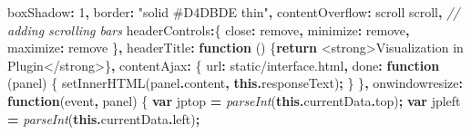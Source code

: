 \documentclass[
]{article}
\newenvironment{Shaded}{\begin{snugshade}}{\end{snugshade}}
\newcommand{\AttributeTok}[1]{\textcolor[rgb]{0.77,0.63,0.00}{#1}}
\newcommand{\BuiltInTok}[1]{#1}
\newcommand{\CommentTok}[1]{\textcolor[rgb]{0.56,0.35,0.01}{\textit{#1}}}
\newcommand{\ControlFlowTok}[1]{\textcolor[rgb]{0.13,0.29,0.53}{\textbf{#1}}}
\newcommand{\DataTypeTok}[1]{\textcolor[rgb]{0.13,0.29,0.53}{#1}}
\newcommand{\DecValTok}[1]{\textcolor[rgb]{0.00,0.00,0.81}{#1}}
\newcommand{\FunctionTok}[1]{\textcolor[rgb]{0.00,0.00,0.00}{#1}}
\newcommand{\KeywordTok}[1]{\textcolor[rgb]{0.13,0.29,0.53}{\textbf{#1}}}
\newcommand{\NormalTok}[1]{#1}
\newcommand{\OperatorTok}[1]{\textcolor[rgb]{0.81,0.36,0.00}{\textbf{#1}}}
\newcommand{\PreprocessorTok}[1]{\textcolor[rgb]{0.56,0.35,0.01}{\textit{#1}}}
\newcommand{\StringTok}[1]{\textcolor[rgb]{0.31,0.60,0.02}{#1}}
\begin{document}
\begin{Shaded}
\begin{Highlighting}[]
    \DataTypeTok{boxShadow}\OperatorTok{:} \DecValTok{1}\OperatorTok{,}
    \DataTypeTok{border}\OperatorTok{:} \StringTok{"solid \#D4DBDE thin"}\OperatorTok{,}
    \DataTypeTok{contentOverflow}\OperatorTok{:} \StringTok{\textquotesingle{}scroll scroll\textquotesingle{}}\OperatorTok{,} \CommentTok{// adding scrolling bars}
    \DataTypeTok{headerControls}\OperatorTok{:}\NormalTok{\{}
      \DataTypeTok{close}\OperatorTok{:} \StringTok{\textquotesingle{}remove\textquotesingle{}}\OperatorTok{,}
      \DataTypeTok{minimize}\OperatorTok{:} \StringTok{\textquotesingle{}remove\textquotesingle{}}\OperatorTok{,}
      \DataTypeTok{maximize}\OperatorTok{:} \StringTok{\textquotesingle{}remove\textquotesingle{}}
\NormalTok{    \}}\OperatorTok{,}
    \DataTypeTok{headerTitle}\OperatorTok{:} \KeywordTok{function}\NormalTok{ () \{}\ControlFlowTok{return} \StringTok{\textquotesingle{}\textless{}strong\textgreater{}Visualization in Plugin\textless{}/strong\textgreater{}\textquotesingle{}}\NormalTok{\}}\OperatorTok{,}
    \DataTypeTok{contentAjax}\OperatorTok{:}\NormalTok{ \{}
      \DataTypeTok{url}\OperatorTok{:} \StringTok{\textquotesingle{}static/interface.html\textquotesingle{}}\OperatorTok{,}
      \DataTypeTok{done}\OperatorTok{:} \KeywordTok{function}\NormalTok{ (panel) \{}
            \FunctionTok{setInnerHTML}\NormalTok{(panel}\OperatorTok{.}\AttributeTok{content}\OperatorTok{,} \KeywordTok{this}\OperatorTok{.}\AttributeTok{responseText}\NormalTok{)}\OperatorTok{;}
\NormalTok{      \}}
\NormalTok{    \}}\OperatorTok{,}
    \DataTypeTok{onwindowresize}\OperatorTok{:} \KeywordTok{function}\NormalTok{(}\BuiltInTok{event}\OperatorTok{,}\NormalTok{ panel) \{}
      \KeywordTok{var}\NormalTok{ jptop }\OperatorTok{=} \PreprocessorTok{parseInt}\NormalTok{(}\KeywordTok{this}\OperatorTok{.}\AttributeTok{currentData}\OperatorTok{.}\AttributeTok{top}\NormalTok{)}\OperatorTok{;}
      \KeywordTok{var}\NormalTok{ jpleft }\OperatorTok{=} \PreprocessorTok{parseInt}\NormalTok{(}\KeywordTok{this}\OperatorTok{.}\AttributeTok{currentData}\OperatorTok{.}\AttributeTok{left}\NormalTok{)}\OperatorTok{;}
      

\end{Highlighting}
\end{Shaded}
\end{document}
